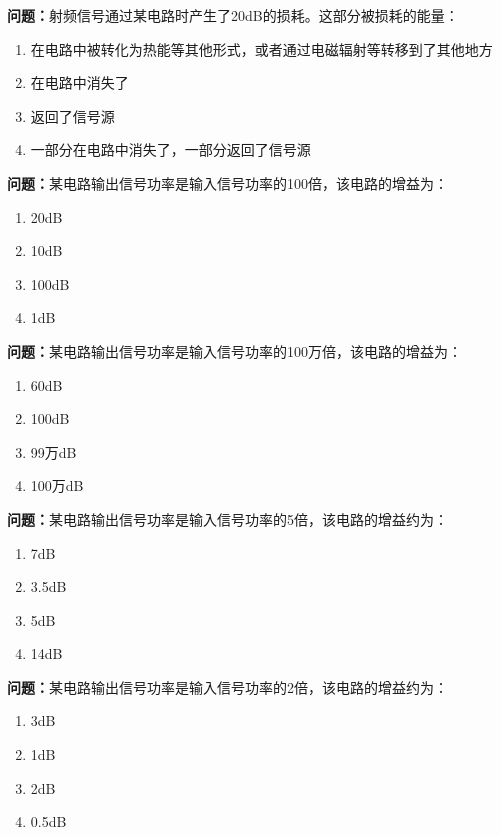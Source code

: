 \noindent\textbf{问题：}射频信号通过某电路时产生了20dB的损耗。这部分被损耗的能量：
\begin{enumerate}[label=\Alph*), leftmargin=3em]
\item 在电路中被转化为热能等其他形式，或者通过电磁辐射等转移到了其他地方
\item 在电路中消失了
\item 返回了信号源
\item 一部分在电路中消失了，一部分返回了信号源
\end{enumerate}

\bigskip


\noindent\textbf{问题：}某电路输出信号功率是输入信号功率的100倍，该电路的增益为：
\begin{enumerate}[label=\Alph*), leftmargin=3em]
\item 20dB
\item 10dB
\item 100dB
\item 1dB
\end{enumerate}

\bigskip


\noindent\textbf{问题：}某电路输出信号功率是输入信号功率的100万倍，该电路的增益为：
\begin{enumerate}[label=\Alph*), leftmargin=3em]
\item 60dB
\item 100dB
\item 99万dB
\item 100万dB
\end{enumerate}

\bigskip


\noindent\textbf{问题：}某电路输出信号功率是输入信号功率的5倍，该电路的增益约为：
\begin{enumerate}[label=\Alph*), leftmargin=3em]
\item 7dB
\item 3.5dB
\item 5dB
\item 14dB
\end{enumerate}

\bigskip


\noindent\textbf{问题：}某电路输出信号功率是输入信号功率的2倍，该电路的增益约为：
\begin{enumerate}[label=\Alph*), leftmargin=3em]
\item 3dB
\item 1dB
\item 2dB
\item 0.5dB
\end{enumerate}

